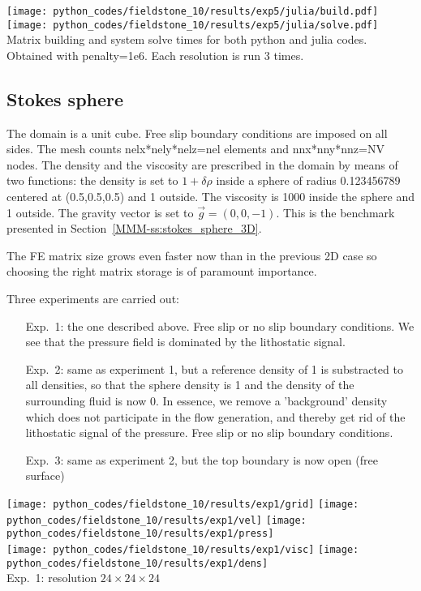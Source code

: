 \begin{center}
\texttt{[image: python\_codes/fieldstone\_10/results/exp5/julia/build.pdf]}
\texttt{[image: python\_codes/fieldstone\_10/results/exp5/julia/solve.pdf]}\\
{\captionfont Matrix building and system solve times for both python and julia codes.
Obtained with penalty=1e6. Each resolution is run 3 times.}
\end{center}



\subsection*{Stokes sphere}

The domain is a unit cube. Free slip boundary conditions 
are imposed on all sides. The mesh counts 
nelx*nely*nelz=nel elements and 
nnx*nny*nnz=NV nodes.
The density and the viscosity are prescribed in the domain 
by means of two functions:
the density is set to $1+\delta \rho$ inside a sphere of radius 0.123456789 centered 
at (0.5,0.5,0.5) and 1 outside. The viscosity is 1000 inside the sphere
and 1 outside.  The gravity vector is set to $\vec{g}=(0,0,-1)$.
This is the benchmark presented in Section~\ref{MMM-ss:stokes_sphere_3D}.

The FE matrix size grows even faster now than in the previous 2D case so
choosing the right matrix storage is of paramount importance. 

Three experiments are carried out:
\begin{enumerate}
\item[Exp.~1:] the one described above.
Free slip or no slip boundary conditions.
We see that the pressure field is dominated by the lithostatic signal.
\item[Exp.~2:] same as experiment 1, but a reference density of 1 is substracted to all densities, so that 
the sphere density is 1 and the density of the surrounding fluid is now 0. In essence, we remove a
'background' density which does not participate in the flow generation, and thereby get rid of the 
lithostatic signal of the pressure.
Free slip or no slip boundary conditions.
\item[Exp.~3:] same as experiment 2, but the top boundary is now open (free surface)
\end{enumerate} 

\begin{center}
\texttt{[image: python\_codes/fieldstone\_10/results/exp1/grid]}
\texttt{[image: python\_codes/fieldstone\_10/results/exp1/vel]}
\texttt{[image: python\_codes/fieldstone\_10/results/exp1/press]}\\
\texttt{[image: python\_codes/fieldstone\_10/results/exp1/visc]}
\texttt{[image: python\_codes/fieldstone\_10/results/exp1/dens]}\\
{\small Exp.~1: resolution $24\times 24\times 24$}
\end{center}

